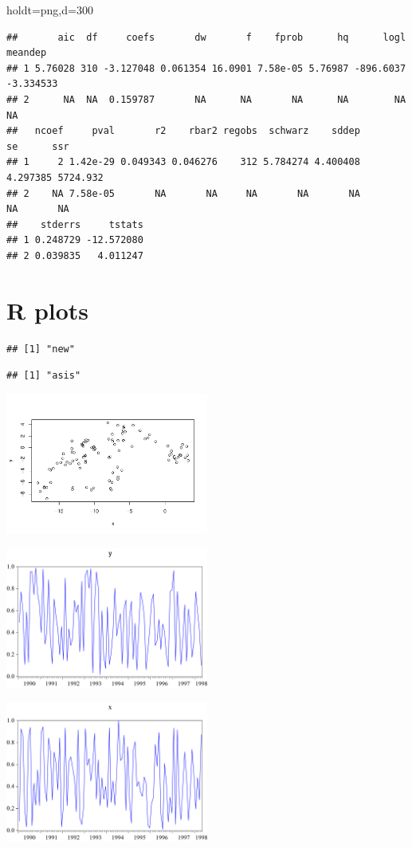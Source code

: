 \documentclass[
]{article}
\begin{document}
holdt=png,d=300

\begin{verbatim}
##       aic  df     coefs       dw       f    fprob      hq      logl   meandep
## 1 5.76028 310 -3.127048 0.061354 16.0901 7.58e-05 5.76987 -896.6037 -3.334533
## 2      NA  NA  0.159787       NA      NA       NA      NA        NA        NA
##   ncoef     pval       r2    rbar2 regobs  schwarz    sddep       se      ssr
## 1     2 1.42e-29 0.049343 0.046276    312 5.784274 4.400408 4.297385 5724.932
## 2    NA 7.58e-05       NA       NA     NA       NA       NA       NA       NA
##    stderrs     tstats
## 1 0.248729 -12.572080
## 2 0.039835   4.011247
\end{verbatim}

\hypertarget{r-plots}{%
\section{R plots}\label{r-plots}}

\begin{verbatim}
## [1] "new"
\end{verbatim}

\begin{verbatim}
## [1] "asis"
\end{verbatim}

\begin{center}\includegraphics[width=0.5\textwidth]{test_engEviews_files/figure-latex/label-1} \end{center}

\begin{center}\includegraphics[width=0.5\textwidth]{EViewsR_files/eview-graph-y} \end{center}

\begin{center}\includegraphics[width=0.5\textwidth]{EViewsR_files/eview-graph-x} \end{center}
\end{document}

